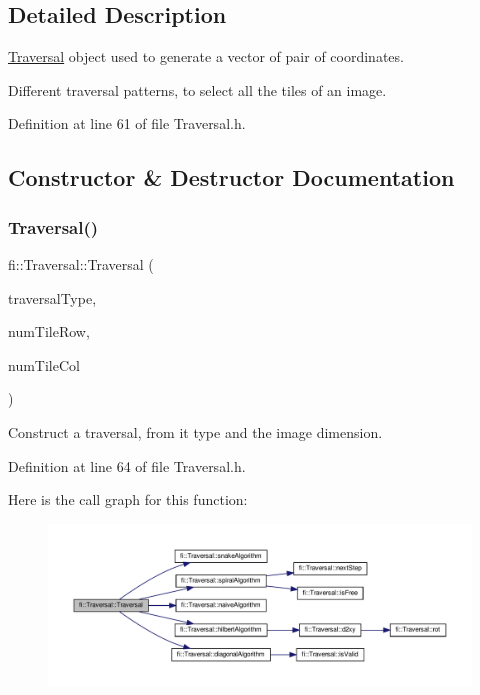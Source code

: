 \subsection{Detailed Description}
\hyperlink{classfi_1_1Traversal}{Traversal} object used to generate a vector of pair of coordinates. 

Different traversal patterns, to select all the tiles of an image. 

Definition at line 61 of file Traversal.\+h.



\subsection{Constructor \& Destructor Documentation}
\mbox{\label{classfi_1_1Traversal_a789f0f9a1641ac219367922fb9fc8fb0}} 
\subsubsection{\texorpdfstring{Traversal()}{Traversal()}}
{\footnotesize\ttfamily fi\+::\+Traversal\+::\+Traversal (\begin{DoxyParamCaption}\item[{\hyperlink{namespacefi_a7ba5ce68668e7f273b22e5f56ca6dfcb}{Traversal\+Type}}]{traversal\+Type,  }\item[{uint32\+\_\+t}]{num\+Tile\+Row,  }\item[{uint32\+\_\+t}]{num\+Tile\+Col }\end{DoxyParamCaption})\hspace{0.3cm}{\ttfamily [inline]}}



Construct a traversal, from it type and the image dimension. 



Definition at line 64 of file Traversal.\+h.

Here is the call graph for this function\+:
\nopagebreak
\begin{figure}[H]
\begin{center}
\leavevmode
\includegraphics[width=350pt]{d8/d0e/classfi_1_1Traversal_a789f0f9a1641ac219367922fb9fc8fb0_cgraph}
\end{center}
\end{figure}


